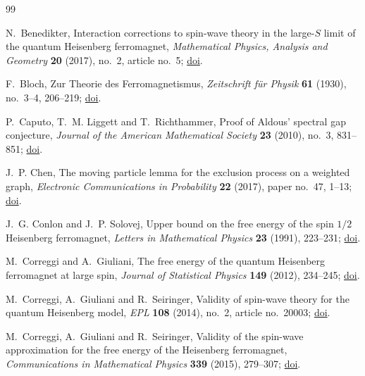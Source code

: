 \documentclass[11pt]{article}
\numberwithin{equation}{section}
\theoremstyle{remark}
\newcommand{\1}{\mathbf 1}
\begin{document}
\begin{thebibliography}{99}
\fontsize{9.5pt}{10.1pt}\selectfont
\setlength{\itemsep}{0em}
\setlength{\parsep}{0pt}

N.~Benedikter,
\newblock Interaction corrections to spin-wave theory in the large-\(S\)
limit of the quantum Heisenberg ferromagnet,
\newblock \emph{Mathematical Physics, Analysis and Geometry} \textbf{20}
(2017), no.~2, article no.~5;
\newblock \href{https://doi.org/10.1007/s11040-016-9237-6}{doi}.

F.~Bloch,
\newblock Zur Theorie des Ferromagnetismus,
\newblock \emph{Zeitschrift f\"ur Physik} \textbf{61} (1930), no.~3--4,
206--219;
\newblock \href{https://doi.org/10.1007/BF01339661}{doi}.

P.~Caputo, T.~M. Liggett and T.~Richthammer,
\newblock Proof of Aldous' spectral gap conjecture,
\newblock \emph{Journal of the American Mathematical Society} \textbf{23}
(2010), no.~3, 831--851;
\newblock \href{https://doi.org/10.1090/S0894-0347-10-00659-4}{doi}.

J.~P. Chen,
\newblock The moving particle lemma for the exclusion process on a weighted
graph,
\newblock \emph{Electronic Communications in Probability} \textbf{22}
(2017), paper no.~47, 1--13;
\newblock \href{https://doi.org/10.1214/17-ECP82}{doi}.

J.~G. Conlon and J.~P. Solovej,
\newblock Upper bound on the free energy of the spin \(1/2\) Heisenberg
ferromagnet,
\newblock \emph{Letters in Mathematical Physics} \textbf{23} (1991),
223--231;
\newblock \href{https://doi.org/10.1007/BF01885500}{doi}.

M.~Correggi and A.~Giuliani,
\newblock The free energy of the quantum Heisenberg ferromagnet at large
spin,
\newblock \emph{Journal of Statistical Physics} \textbf{149} (2012),
234--245;
\newblock \href{https://doi.org/10.1007/s10955-012-0589-4}{doi}.

M.~Correggi, A.~Giuliani and R.~Seiringer,
\newblock Validity of spin-wave theory for the quantum Heisenberg model,
\newblock \emph{EPL} \textbf{108} (2014), no.~2, article no.~20003;
\newblock
\href{https://doi.org/10.1209/0295-5075/108/20003}{doi}.

M.~Correggi, A.~Giuliani and R.~Seiringer,
\newblock Validity of the spin-wave approximation for the free energy of
the Heisenberg ferromagnet,
\newblock \emph{Communications in Mathematical Physics} \textbf{339}
(2015), 279--307;
\newblock \href{https://doi.org/10.1007/s00220-015-2402-0}{doi}.


\end{thebibliography}
\end{document}
